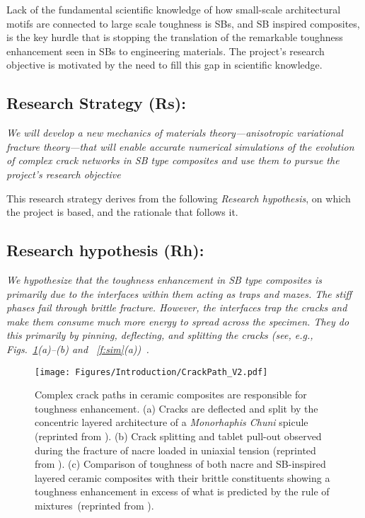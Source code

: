 \documentclass[10pt,letterpaper]{article}
\begin{document}
 Lack of the  fundamental scientific knowledge of how small-scale architectural motifs are connected to large scale toughness is SBs, and SB inspired composites, is the key hurdle that is stopping the  translation of the remarkable  toughness enhancement seen in SBs to engineering materials.  The  project's research objective  is   motivated by the  need to fill this gap in scientific knowledge.%


\subsection{Research Strategy (Rs):} \emph{We  will   develop a new mechanics of materials theory---anisotropic variational fracture theory---that will enable accurate numerical simulations of the evolution of complex crack networks in SB type composites and use them to pursue the project's research objective}%


This research strategy  derives from  the following \emph{Research  hypothesis}, on which the project is based, and the rationale  that follows it.%


\subsection{Research hypothesis (Rh):}
\label{s:hyp}
  \emph{We hypothesize that the toughness enhancement in SB type composites  is primarily due to the interfaces within them acting as traps and mazes. The stiff phases fail through brittle fracture. However, the interfaces trap the cracks and make them consume much more energy to spread across the specimen. They do this primarily by pinning, deflecting, and splitting the cracks (see, e.g., Figs.~\ref{f:hyp}(a)--(b) and ~\ref{f:sim}(a))~\cite{gao1989first,dalmas2009crack,gu1997crack}. }%



       \begin{figure}[t!]
         \centering
           \texttt{[image: Figures/Introduction/CrackPath\_V2.pdf]}
           \caption{ \footnotesize Complex crack paths in ceramic composites are responsible for toughness enhancement. (a) Cracks are deflected and split by the concentric layered architecture of a \textit{Monorhaphis Chuni} spicule (reprinted from \cite{Weaver:2010ew}). (b) Crack splitting and tablet pull-out observed during the fracture of nacre loaded in uniaxial tension (reprinted from \cite{wegst2015bioinspired}). (c) Comparison of toughness of both nacre and SB-inspired layered ceramic composites with their brittle constituents showing a toughness enhancement in excess of what is predicted by the rule of mixtures~(reprinted from \cite{wegst2015bioinspired}).
             }
           \label{f:hyp}
       \end{figure}
\end{document}
